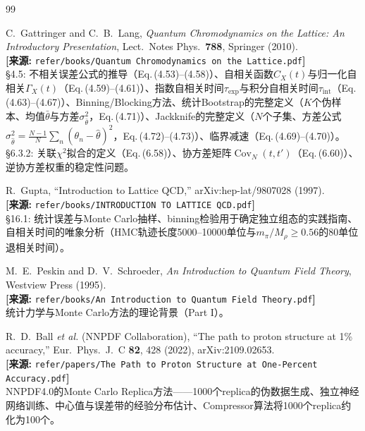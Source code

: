 \documentclass[12pt,a4paper]{ctexart}
\theoremstyle{definition}
\begin{document}
\begin{thebibliography}{99}

C.~Gattringer and C.~B.~Lang,
\textit{Quantum Chromodynamics on the Lattice: An Introductory Presentation},
Lect.\ Notes Phys.\ \textbf{788}, Springer (2010).
\\\textbf{[来源:} \texttt{refer/books/Quantum Chromodynamics on the Lattice.pdf}\textbf{]}
\\§4.5: 不相关误差公式的推导（Eq.\,(4.53)--(4.58)）、自相关函数$C_X(t)$与归一化自相关$\Gamma_X(t)$（Eq.\,(4.59)--(4.61)）、指数自相关时间$\tau_{\text{exp}}$与积分自相关时间$\tau_{\text{int}}$（Eq.\,(4.63)--(4.67)）、Binning/Blocking方法、统计Bootstrap的完整定义（$K$个伪样本、均值$\bar\theta$与方差$\sigma_{\bar\theta}^2$，Eq.\,(4.71)）、Jackknife的完整定义（$N$个子集、方差公式$\sigma^2_{\hat\theta} = \frac{N-1}{N}\sum_n(\theta_n-\hat\theta)^2$，Eq.\,(4.72)--(4.73)）、临界减速（Eq.\,(4.69)--(4.70)）。§6.3.2: 关联$\chi^2$拟合的定义（Eq.\,(6.58)）、协方差矩阵$\operatorname{Cov}_N(t,t')$（Eq.\,(6.60)）、逆协方差权重的稳定性问题。

R.~Gupta,
``Introduction to Lattice QCD,''
arXiv:hep-lat/9807028 (1997).
\\\textbf{[来源:} \texttt{refer/books/INTRODUCTION TO LATTICE QCD.pdf}\textbf{]}
\\§16.1: 统计误差与Monte Carlo抽样、binning检验用于确定独立组态的实践指南、自相关时间的唯象分析（HMC轨迹长度5000--10000单位与$m_\pi/M_\rho \ge 0.56$的80单位退相关时间）。

M.~E.~Peskin and D.~V.~Schroeder,
\textit{An Introduction to Quantum Field Theory},
Westview Press (1995).
\\\textbf{[来源:} \texttt{refer/books/An Introduction to Quantum Field Theory.pdf}\textbf{]}
\\统计力学与Monte Carlo方法的理论背景（Part I）。

R.~D.~Ball \textit{et al.} (NNPDF Collaboration),
``The path to proton structure at 1\% accuracy,''
Eur.\ Phys.\ J.\ C \textbf{82}, 428 (2022), arXiv:2109.02653.
\\\textbf{[来源:} \texttt{refer/papers/The Path to Proton Structure at One-Percent Accuracy.pdf}\textbf{]}
\\NNPDF4.0的Monte Carlo Replica方法——1000个replica的伪数据生成、独立神经网络训练、中心值与误差带的经验分布估计、Compressor算法将1000个replica约化为100个。


\end{thebibliography}
\end{document}

